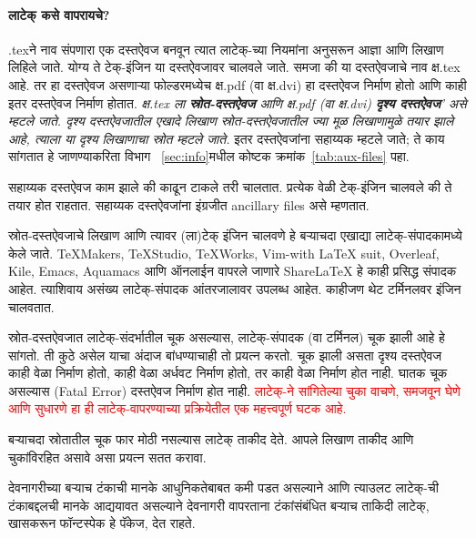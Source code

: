 \documentclass[11pt]{article}
\newcommand{\7}{\textbackslash}
\newcommand{\Syn}{\textenglish}
\begin{document}
\paragraph{लाटेक् कसे वापरायचे?} \Syn{.tex}ने नाव संपणारा एक दस्तऐवज
बनवून त्यात लाटेक्-च्या नियमांना अनुसरून आज्ञा आणि लिखाण लिहिले जाते. योग्य ते
टेक्-इंजिन या दस्तऐवजावर चालवले जाते. समजा की या दस्तऐवजाचे नाव क्ष.\Syn{tex}
आहे. तर हा दस्तऐवज असणाऱ्या फोल्डरमध्येच क्ष.\Syn{pdf} (वा क्ष.\Syn{dvi}) हा
दस्तऐवज निर्माण होतो आणि काही इतर दस्तऐवज निर्माण होतात. \emph{क्ष.\Syn{tex} ला \textbf{स्रोत-दस्तऐवज}
 आणि क्ष.\Syn{pdf} (वा क्ष.\Syn{dvi}) \textbf{दृश्य दस्तऐवज}' असे म्हटले जाते. दृश्य
 दस्तऐवजातील एखादे लिखाण स्रोत-दस्तऐवजातील ज्या मूळ लिखाणामुळे तयार झाले आहे,
 त्याला या दृश्य लिखाणाचा स्रोत म्हटले जाते.}
इतर दस्तऐवजांना सहाय्यक म्हटले जाते; ते काय सांगतात हे
जाणण्याकरिता विभाग ~\ref{sec:info}मधील कोष्टक क्रमांक~\ref{tab:aux-files}
पहा.
\medskip

सहाय्यक दस्तऐवज काम झाले की काढून टाकले तरी चालतात. प्रत्येक वेळी टेक्-इंजिन चालवले
की ते तयार होत राहतात. सहाय्यक दस्तऐवजांना इंग्रजीत {\Bask ancillary files} असे म्हणतात.
\medskip

स्रोत-दस्तऐवजाचे लिखाण आणि त्यावर (ला)टेक् इंजिन चालवणे हे बऱ्याचदा एखाद्या
लाटेक्-संपादकामध्ये केले जाते. {\Bask TeXMakers, TeXStudio, TeXWorks, Vim-with
 LaTeX suit, Overleaf, Kile, Emacs, Aquamacs} आणि ऑनलाईन वापरले जाणारे
{\Bask ShareLaTeX} हे काही प्रसिद्ध संपादक आहेत. त्याशिवाय असंख्य लाटेक्-संपादक
आंतरजालावर उपलब्ध आहेत. काहीजण थेट टर्मिनलवर इंजिन चालवतात.
\medskip

स्रोत-दस्तऐवजात लाटेक्-संदर्भातील चूक असल्यास, लाटेक्-संपादक (वा टर्मिनल) चूक झाली
आहे हे सांगतो. ती कुठे असेल याचा अंदाज बांधण्याचाही तो प्रयत्न करतो. चूक झाली असता
दृश्य दस्तऐवज काही वेळा निर्माण होतो, काही वेळा अर्धवट निर्माण होतो, तर काही
वेळा निर्माण होत नाही. घातक चूक असल्यास (\Syn{Fatal Error}) दस्तऐवज निर्माण
होत नाही. \textcolor{red}{लाटेक्-ने सांगितेल्या चुका वाचणे, समजवून घेणे आणि सुधारणे
 हा ही लाटेक्-वापरण्याच्या प्रक्रियेतील एक महत्त्वपूर्ण घटक आहे.}
\medskip

बऱ्याचदा स्रोतातील चूक फार मोठी नसल्यास लाटेक् ताकीद देते. आपले लिखाण ताकीद
आणि चुकांविरहित असावे असा प्रयत्न सतत करावा.
\medskip

देवनागरीच्या बऱ्याच टंकाची मानके आधुनिकतेबाबत कमी पडत असल्याने आणि त्याउलट लाटेक्-ची
टंकाबद्दलची मानके आद्ययावत असल्याने देवनागरी वापरताना टंकांसंबंधित बऱ्याच ताकिदी
लाटेक्, खासकरून फॉन्टस्पेक हे पॅकेज, देत राहते.
\medskip
\end{document}
